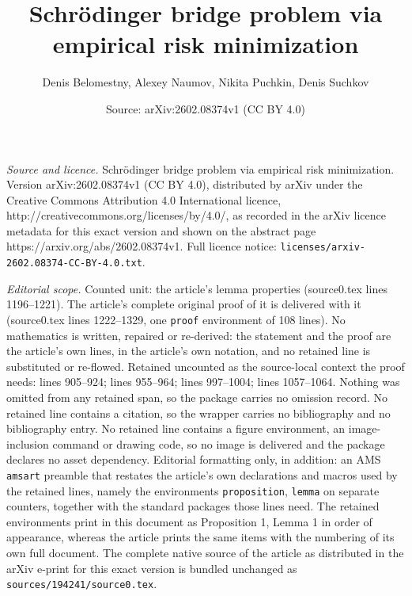 \documentclass[10pt,a4paper]{amsart}
\title{Schr\"odinger bridge problem via empirical risk minimization}
\author{Denis Belomestny, Alexey Naumov, Nikita Puchkin, Denis Suchkov}
\date{Source: arXiv:2602.08374v1 (CC BY 4.0)}
\begin{document}
\maketitle

\noindent\emph{Source and licence.} Schr\"odinger bridge problem via empirical risk minimization. Version arXiv:2602.08374v1 (CC BY 4.0), distributed by arXiv under the Creative Commons Attribution 4.0 International licence, http://creativecommons.org/licenses/by/4.0/, as recorded in the arXiv licence metadata for this exact version and shown on the abstract page https://arxiv.org/abs/2602.08374v1. Full licence notice: \texttt{licenses/arxiv-2602.08374-CC-BY-4.0.txt}.\par\smallskip

\noindent\textit{Editorial scope.} Counted unit: the article's lemma properties (source0.tex lines 1196--1221). The article's complete original proof of it is delivered with it (source0.tex lines 1222--1329, one \texttt{proof} environment of 108 lines). No mathematics is written, repaired or re-derived: the statement and the proof are the article's own lines, in the article's own notation, and no retained line is substituted or re-flowed.  Retained uncounted as the source-local context the proof needs: lines 905--924; lines 955--964; lines 997--1004; lines 1057--1064.  Nothing was omitted from any retained span, so the package carries no omission record.  No retained line contains a citation, so the wrapper carries no bibliography and no bibliography entry.  No retained line contains a figure environment, an image-inclusion command or drawing code, so no image is delivered and the package declares no asset dependency.  Editorial formatting only, in addition: an AMS \texttt{amsart} preamble that restates the article's own declarations and macros used by the retained lines, namely the environments \texttt{proposition}, \texttt{lemma} on separate counters, together with the standard packages those lines need.  The retained environments print in this document as Proposition 1, Lemma 1 in order of appearance, whereas the article prints the same items with the numbering of its own full document.  The complete native source of the article as distributed in the arXiv e-print for this exact version is bundled unchanged as \texttt{sources/194241/source0.tex}.
\end{document}
